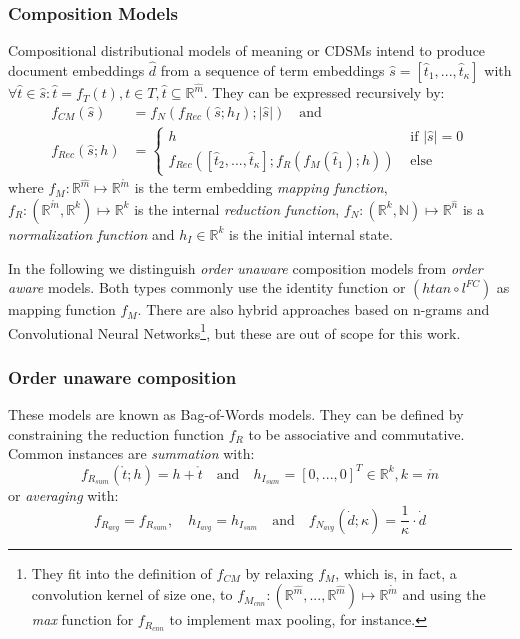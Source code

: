 \subsubsection{Composition Models}
\label{sec:composition_models}
Compositional distributional models of meaning or \acfp{CDSM} \autocite{clark_compositional_2008,grefenstette_experimental_2011} intend to produce document embeddings $\hat{d}$ from a sequence of term embeddings $\hat{s} = [\hat{t}_1, ..., \hat{t}_\kappa]$ with $\forall \hat{t} \in \hat{s}: \hat{t} = f_T(t), t \in T, \hat{t} \subseteq \mathbb{R}^{\hat{m}}$. They can be expressed recursively by:
\begin{equation}
\begin{split}
f_{CM}(\hat{s}) & = f_N(f_{Rec}(\hat{s}; h_I); |\hat{s}|) \quad \text{and} \\
f_{Rec}(\hat{s}; h) & = 
  \begin{cases}  
    h & \text{ if }|\hat{s}|=0 \\
    f_{Rec}([\hat{t}_2, ..., \hat{t}_\kappa]; f_R(f_M(\hat{t}_1); h)) & \text{ else}
  \end{cases}
\end{split}
\end{equation}
where $f_M: \mathbb{R}^{\hat{m}} \mapsto \mathbb{R}^{\mathring{m}}$ is the term embedding \textit{mapping function}, $f_R: (\mathbb{R}^{\mathring{m}},\mathbb{R}^k) \mapsto \mathbb{R}^k$ is the internal \textit{reduction function}, $f_N: (\mathbb{R}^k, \mathbb{N}) \mapsto \mathbb{R}^{\hat{n}}$ is a \textit{normalization function} and $h_I \in \mathbb{R}^k$ is the initial internal state.

In the following we distinguish \textit{order unaware} composition models from \textit{order aware} models. Both types commonly use the identity function or $(htan \circ l^{FC})$ as mapping function $f_M$. There are also hybrid approaches based on n-grams and Convolutional Neural Networks\footnote{They fit into the definition of $f_{CM}$ by relaxing $f_M$, which is, in fact, a convolution kernel of size one, to $f_{M_{cnn}}: (\mathbb{R}^{\hat{m}}, ... ,\mathbb{R}^{\hat{m}}) \mapsto \mathbb{R}^{\mathring{m}}$ and using the \textit{max} function for $f_{R_{cnn}}$ to implement max pooling, for instance.}, but these are out of scope for this work.

\subsubsection*{Order unaware composition} 
These models are known as Bag-of-Words models. They can be defined by constraining the reduction function $f_R$ to be associative and commutative. Common instances are \textit{summation} with:
\begin{equation}
f_{R_{sum}}(\mathring{t}; h) = h + \mathring{t} \quad \text{and} \quad h_{I_{sum}} = [0, ..., 0]^T \in \mathbb{R}^k, k = \mathring{m}
\end{equation}
or \textit{averaging} with: 
\begin{equation}
f_{R_{avg}} = f_{R_{sum}}, \quad h_{I_{avg}} = h_{I_{sum}} \quad \text{and} \quad f_{N_{avg}}(\dot{d}; \kappa) = \frac{1}{\kappa} \cdot \dot{d}
\end{equation}

